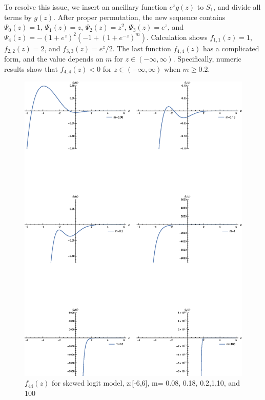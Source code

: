 \documentclass[12pt]{TD-CJS}
\begin{document}


To resolve this issue, we insert an ancillary function $e^zg(z)$ to $S_1$, and divide all terms by $g(z)$. After proper permutation, the new sequence contains $\Psi_0(z) = 1$, $\Psi_1(z) = z$, $\Psi_2(z) = z^2$,  $\Psi_3(z) = e^z$, and $\Psi_4(z) =- (1+e^z)^2(-1+(1+e^{-z})^m)$.
Calculation shows $f_{1,1}(z) = 1$, $f_{2,2}(z) =2$, and $f_{3,3}(z) = e^z/2$. The last function $f_{4,4}(z)$ has a complicated form, and the value depends on $m$ for $z\in (-\infty, \infty)$. Specifically, numeric results show that $f_{4,4}(z)<0$ for  $z\in (-\infty, \infty)$ when $m\ge 0.2$.
\begin{figure}[ht]
    \centering
    \includegraphics[scale = 0.6]{fig2.eps}
\caption{$f_{44}(z)$ for skewed logit model, z:[-6,6], m= 0.08, 0.18, 0.2,1,10, and 100}
\label{fig:skewedlogit_after}
\end{figure}
\end{document}
